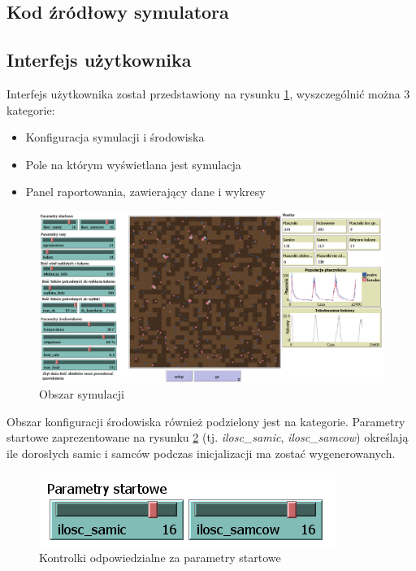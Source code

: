 \documentclass[a4paper,11pt,titlepage]{article}
\begin{document}
\subsection{Kod źródłowy symulatora}

\subsection{Interfejs użytkownika}
Interfejs użytkownika został przedstawiony na rysunku \ref{fig:9}, wyszczególnić można 3 kategorie:
\begin{itemize}
	\item Konfiguracja symulacji i środowiska
	\item Pole na którym wyświetlana jest symulacja
	\item Panel raportowania, zawierający dane i wykresy
\end{itemize}

\begin{figure}[H]
\centering
\includegraphics[width=1\columnwidth]{img/symulacja.PNG}
\caption{Obszar symulacji}
\label{fig:9}
\end{figure}

Obszar konfiguracji środowiska również podzielony jest na kategorie. Parametry startowe zaprezentowane na rysunku \ref{fig:6} (tj. \textit{ilosc\_samic}, \textit{ilosc\_samcow}) określają ile dorosłych samic i samców podczas inicjalizacji ma zostać wygenerowanych.

\begin{figure}[H]
\centering
\includegraphics[width=.5\columnwidth]{img/parametry_startowe.PNG}
\caption{Kontrolki odpowiedzialne za parametry startowe}
\label{fig:6}
\end{figure}
\end{document}
